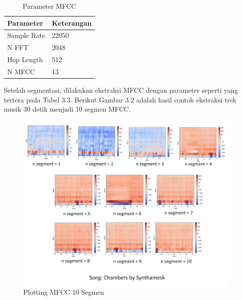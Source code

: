 \begin{table}[h]
	
	\centering
	
	\caption{Parameter MFCC}
	
	\begin{tabular}{|l|l|}
		\hline
		\textbf{Parameter} & \textbf{Keterangan} \\ \hline
		Sample Rate        & 22050               \\ \hline
		N FFT              & 2048                \\ \hline
		Hop Length         & 512                 \\ \hline
		N MFCC             & 13                  \\ \hline
	\end{tabular}

	\label{fig:mfccparameter}
\end{table}

Setelah segmentasi, dilakukan ekstraksi MFCC dengan parameter seperti yang tertera pada Tabel 3.3. Berikut Gambar 3.2 adalah hasil contoh ekstraksi trek musik 30 detik menjadi 10 segmen MFCC.

\begin{figure}[h]
	\centering
	
	\includegraphics[width=\textwidth]{gambar/mfcc segments1}
	
	\caption{Plotting MFCC 10 Segmen}
	\label{fig:mfccsegmen}
\end{figure}

